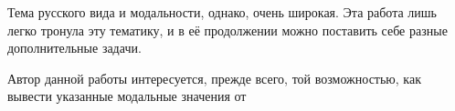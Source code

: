 \documentclass{article}
\begin{document}
Тема русского вида и модальности, однако, очень широкая. Эта работа лишь легко тронула эту тематику, и в её продолжении можно поставить себе разные дополнительные задачи. 

Автор данной работы интересуется, прежде всего, той возможностью, как вывести указанные модальные значения от 










%
%
\end{document}
